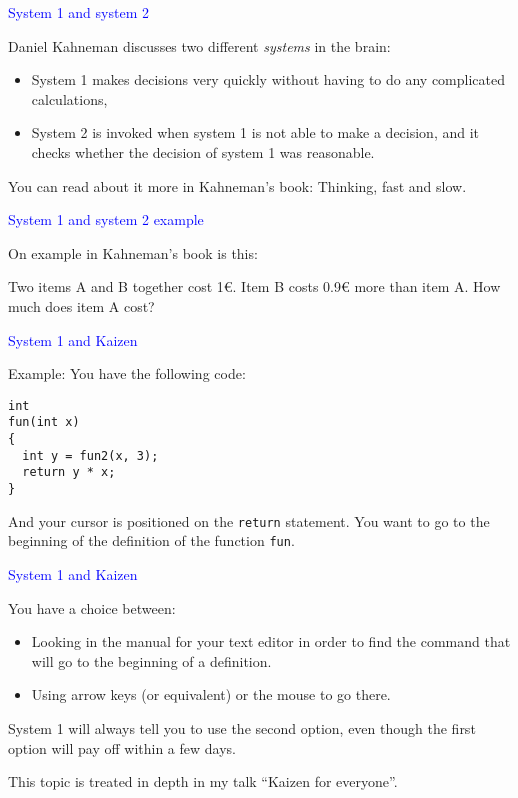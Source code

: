 \documentclass{slides}
\newcommand{\ti}[1]{\begin{center}\Large{\textcolor{blue}{#1}}\end{center}}
\begin{document}
\begin{slide}\ti{System 1 and system 2}

Daniel Kahneman discusses two different \emph{systems} in the brain:

\begin{itemize}
\item System 1 makes decisions very quickly without having to do any
  complicated calculations,
\item System 2 is invoked when system 1 is not able to make a
  decision, and it checks whether the decision of system 1 was
  reasonable.
\end{itemize}

You can read about it more in Kahneman's book: Thinking, fast and
slow.

\vfill\end{slide}
\begin{slide}\ti{System 1 and system 2 example}

On example in Kahneman's book is this:

Two items A and B together cost 1\euro{}.  Item B costs 0.9\euro{}
more than item A.  How much does item A cost?

\vfill\end{slide}
\begin{slide}\ti{System 1 and Kaizen}

Example:  You have the following code:

\begin{verbatim}
int
fun(int x)
{
  int y = fun2(x, 3);
  return y * x;
}
\end{verbatim}

And your cursor is positioned on the \texttt{return} statement.  You
want to go to the beginning of the definition of the function
\texttt{fun}.

\vfill\end{slide}
\begin{slide}\ti{System 1 and Kaizen}

You have a choice between:

\begin{itemize}
\item Looking in the manual for your text editor in order to find the
  command that will go to the beginning of a definition.
\item Using arrow keys (or equivalent) or the mouse to go there.
\end{itemize}

System 1 will always tell you to use the second option, even though
the first option will pay off within a few days.

This topic is treated in depth in my talk ``Kaizen for everyone''.

\vfill\end{slide}
\end{document}
